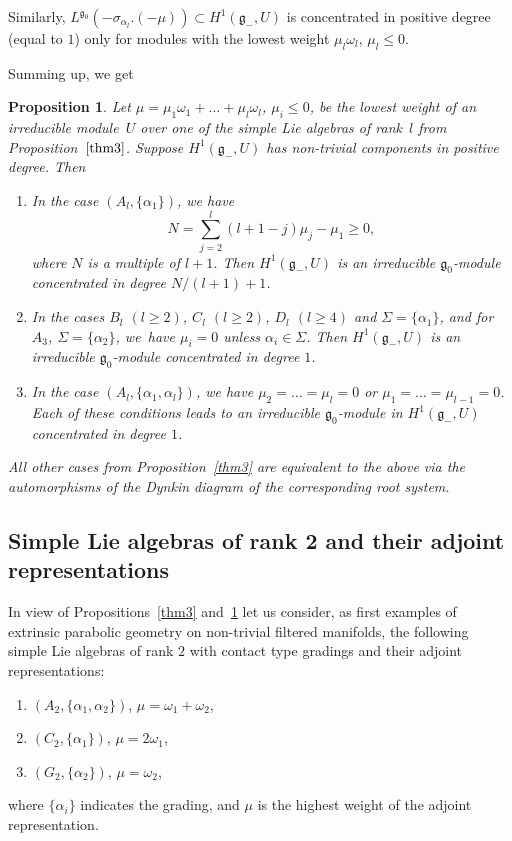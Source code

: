 \documentclass[10pt,a4paper]{amsart}
\newcommand{\g}{\mathfrak g}
\newcommand{\om}{\omega}
\newtheorem{prop}[thm]{Proposition}
\numberwithin{equation}{section}
\begin{document}
Similarly, $L^{\g_0}(-\sigma_{\alpha_l}.(-\mu))\subset H^1(\g_{-},U)$ is concentrated in positive degree (equal to $1$) only for modules with the lowest weight $\mu_l\om_l$, $\mu_l\le 0$.

Summing up, we get
\begin{prop}\label{prop7}
	Let $\mu=\mu_1\om_1+\dots+\mu_l\om_l$, $\mu_i\le 0$, be the lowest weight of an irreducible module~$U$ over one of the simple Lie algebras of rank~$l$ from Proposition~$\ref{thm3}$. Suppose $H^1(\g_{-},U)$ has non-trivial components in positive degree. Then
	\begin{enumerate}\itemsep=0pt
		\item[$1.$] In the case $(A_l,\{\alpha_1\})$, we have
		\[
		N = \sum_{j=2}^l (l+1-j)\mu_j - \mu_1 \ge 0,
		\]
 where $N$ is a multiple of $l+1$. Then $H^1(\g_{-},U)$ is an irreducible $\g_0$-module concentrated in degree $N/(l+1)+1$.

\item[$2.$] In the cases $B_l$ $(l\ge 2)$, $C_l$ $(l\ge 2)$, $D_l$ $(l\ge 4)$ and $\Sigma=\{\alpha_1\}$, and for $A_3$, $\Sigma=\{\alpha_2\}$, we~have $\mu_i=0$ unless $\alpha_i\in\Sigma$. Then $H^1(\g_{-},U)$ is an irreducible $\g_0$-module concentrated in degree $1$.

\item[$3.$] In the case $(A_l,\{\alpha_1,\alpha_l\})$, we have $\mu_2=\dots=\mu_l=0$ or $\mu_1=\dots=\mu_{l-1}=0$. Each of these conditions leads to an irreducible $\g_0$-module in $H^1(\g_{-},U)$ concentrated in degree $1$.
	\end{enumerate}
 All other cases from Proposition~{\rm \ref{thm3}} are equivalent to the above via the automorphisms of the Dynkin diagram of the corresponding root system.
\end{prop}


\subsection{Simple Lie algebras of rank 2 and their adjoint representations}
\label{rank2ex}

In view of Propositions~\ref{thm3} and~\ref{prop7} let us consider, as first examples of extrinsic parabolic geometry on non-trivial filtered manifolds,
the following simple Lie algebras of rank $2$ with contact type gradings and their adjoint representations:
\begin{enumerate}\itemsep=0pt
	\item[$(i)$] $(A_2, \{ \alpha_1, \alpha_2\})$, $\mu=\omega_1+\omega_2$,
	\item[$(ii)$] $(C_2, \{ \alpha_1\})$, $\mu=2\omega_1$,
	\item[$(iii)$] $(G_2,\{ \alpha_2\})$, $\mu=\omega_2$,
\end{enumerate}
where $\{ \alpha _i \}$ indicates the grading, and $\mu$ is the highest weight of the adjoint representation.
\end{document}
